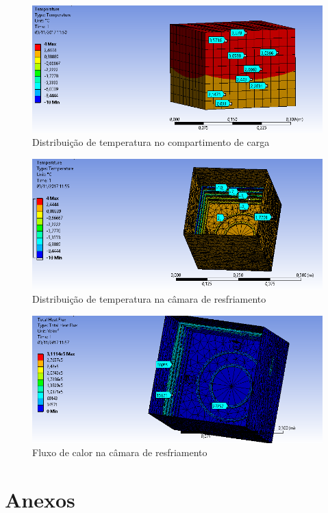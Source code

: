 \begin{figure}[H]
	\centering
	\includegraphics[scale=.7]{figuras/tempcompartimento.png}
	\caption{Distribuição de temperatura no compartimento de carga}
\end{figure}

\begin{figure}[H]
	\centering
	\includegraphics[scale=.7]{figuras/tempcamara.png}
	\caption{Distribuição de temperatura na câmara de resfriamento}
\end{figure}

\begin{figure}[H]
	\centering
	\includegraphics[scale=.7]{figuras/fluxocamara.png}
	\caption{Fluxo de calor na câmara de resfriamento}
\end{figure}

\chapter{Anexos}

